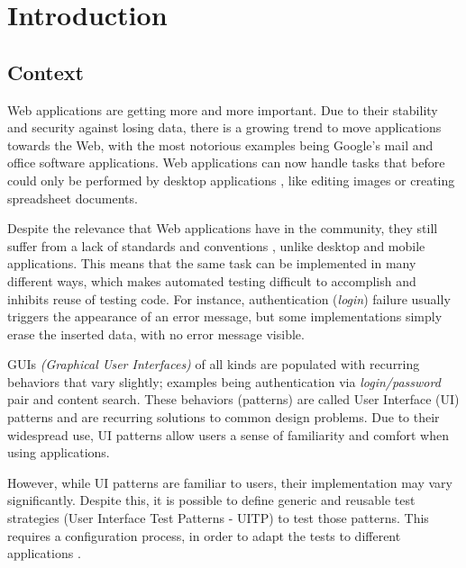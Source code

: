 \chapter{Introduction} \label{chap:intro}

\section*{}

\section{Context} \label{sec:context}

Web applications are getting more and more important. Due to their stability and security against losing data, there is a growing trend to move applications towards the Web, with the most notorious examples being Google's mail and office software applications. Web applications can now handle tasks that before could only be performed by desktop applications \cite{garrett2005ajax}, like editing images or creating spreadsheet documents.

Despite the relevance that Web applications have in the community, they still suffer from a lack of standards and conventions \cite{constantine2002usage}, unlike desktop and mobile applications. This means that the same task can be implemented in many different ways, which makes automated testing difficult to accomplish and inhibits reuse of testing code. For instance, authentication (\textit{login}) failure usually triggers the appearance of an error message, but some implementations simply erase the inserted data, with no error message visible.

GUIs \textit{(Graphical User Interfaces)} of all kinds are populated with recurring behaviors that vary slightly; examples being authentication via \textit{login/password} pair and content search. These behaviors (patterns) are called User Interface (UI) patterns \cite{van2001patterns} and are recurring solutions to common design problems. Due to their widespread use, UI patterns allow users a sense of familiarity and comfort when using applications.

However, while UI patterns are familiar to users, their implementation may vary significantly. Despite this, it is possible to define generic and reusable test strategies (User Interface Test Patterns - UITP) to test those patterns. This requires a configuration process, in order to adapt the tests to different applications \cite{dalal1999model}.

